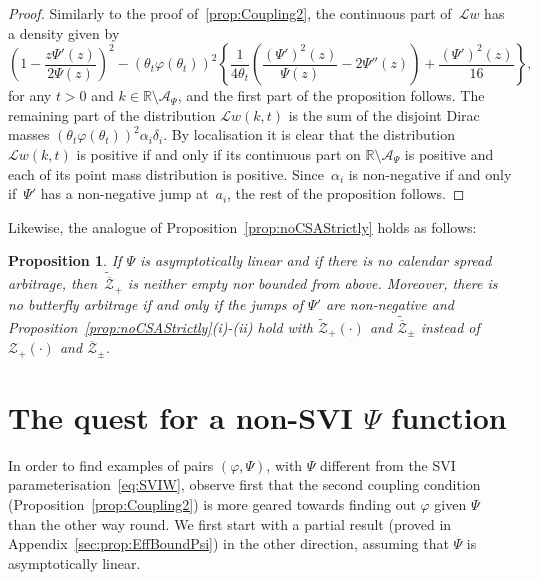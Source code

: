 \documentclass{amsart}[11pt]
\numberwithin{equation}{section}
\newtheorem{proposition}[theorem]{Proposition}
\theoremstyle{definition}
\newcommand{\RR}{\mathbb{R}}
\newcommand{\Ll}{\mathcal{L}}
\newcommand{\Zz}{\mathcal{Z}}
\begin{document}
\begin{proof}
Similarly to the proof of~\ref{prop:Coupling2}, the continuous part of~$\Ll w$ has a density given by
$$
\left(1-\frac{z\Psi'(z)}{2\Psi(z)}\right)^2-(\theta_t \varphi(\theta_t))^2 
\left\{\frac{1}{4 \theta_t} \left(\frac{(\Psi') ^{2}(z)}{\Psi(z)}-2\Psi''(z)\right)+\frac{(\Psi')^{2}(z)}{16}\right\},
$$
for any $t>0$ and $k\in \RR\setminus\mathcal{A}_{\Psi}$,
and the first part of the proposition follows.
The remaining part of the distribution $\Ll w (k,t) $ is the sum of the disjoint Dirac masses 
$(\theta_t \varphi(\theta_t))^2 \alpha_i \delta_i $.
By localisation it is clear that the distribution $\Ll w (k,t) $ is positive if and only if its continuous part on 
$\RR \setminus \mathcal{A}_{\Psi}$ is positive and each
of its point mass distribution is positive. 
Since~$\alpha_i$ is non-negative if and only if~$\Psi'$ has a non-negative jump at~$a_i$, 
the rest of the proposition follows.
\end{proof}

Likewise, the analogue of Proposition~\ref{prop:noCSAStrictly} holds as follows:

\begin{proposition} \label{prop:noCSAStrictlyweak}
If $\Psi$ is asymptotically linear and if there is no calendar spread arbitrage, 
then~$\widetilde{\overline{\Zz}}_+$ is neither empty nor bounded from above.
Moreover, there is no butterfly arbitrage if and only if 
the jumps of $\Psi'$ are non-negative and 
Proposition~\ref{prop:noCSAStrictly}(i)-(ii) hold with $\widetilde{\Zz}_+(\cdot)$ and 
$\widetilde{\overline{\Zz}}_\pm$ instead of 
$\Zz_+(\cdot)$ and $\overline{\Zz}_\pm$.
\end{proposition}




\section{The quest for a non-SVI $\Psi$ function\label{sec_example}}
In order to find examples of pairs $(\varphi, \Psi)$, with $\Psi$ different from the SVI parameterisation~\eqref{eq:SVIW}, 
observe first that the second coupling condition (Proposition~\ref{prop:Coupling2}) is more geared 
towards finding out $\varphi$ given $\Psi$ than the other way round. 
We first start with a partial result (proved in Appendix~\ref{sec:prop:EffBoundPsi}) in the other direction, 
assuming that $\Psi$ is asymptotically linear.
\end{document}

